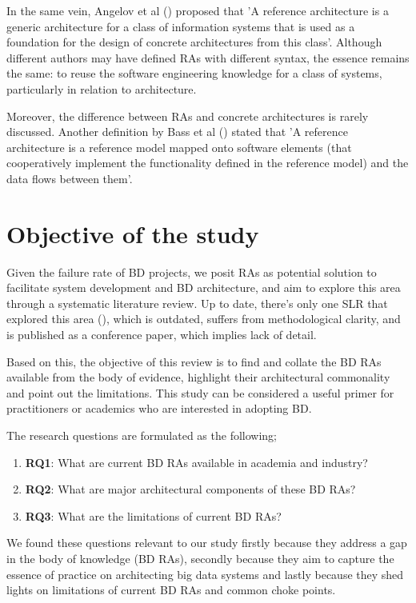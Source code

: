 \documentclass[review]{elsarticle}
\begin{document}
In the same vein, Angelov et al (\cite{angelov2009classification}) proposed that 'A reference architecture is a generic architecture for a class of information systems that is used as a foundation for the design of concrete architectures from this class'. Although different authors may have defined RAs with different syntax, the essence remains the same: to reuse the software engineering knowledge for a class of systems, particularly in relation to architecture. 

Moreover, the difference between RAs and concrete architectures is rarely discussed. Another definition by Bass et al (\cite{Bass}) stated that 'A reference architecture is a reference model mapped onto software elements (that cooperatively implement the functionality defined in the reference model) and the data flows between them'. 



\section{Objective of the study}

Given the failure rate of BD projects, we posit RAs as potential solution to facilitate system development and BD architecture, and aim to explore this area through a systematic literature review. Up to date, there's only one SLR that explored this area (\cite{AtaeiACIS}), which is outdated, suffers from methodological clarity, and is published as a conference paper, which implies lack of detail.

Based on this, the objective of this review is to find and collate the BD RAs available from the body of evidence, highlight their architectural commonality and point out the limitations. This study can be considered a useful primer for practitioners or academics who are interested in adopting BD. 

The research questions are formulated as the following; 
\begin{enumerate}
    \item \textbf{RQ1}: What are current BD RAs available in academia and industry?
    \item \textbf{RQ2}: What are major architectural components of these BD RAs? 
    \item \textbf{RQ3}: What are the limitations of current BD RAs?
\end{enumerate}

We found these questions relevant to our study firstly because they address a gap in the body of knowledge (BD RAs), secondly because they aim to capture the essence of practice on architecting big data systems and lastly because they shed lights on limitations of current BD RAs and common choke points. 
\end{document}
